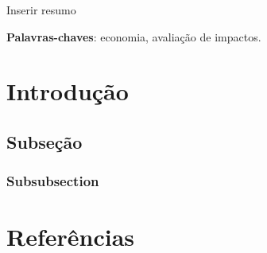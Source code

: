 \documentclass[12pt,english, french, spanish, german, brazil,a4paper,twoside, openright]{abntex2}	%
\begin{document}
	
	
	\frenchspacing 
	
	
\imprimircapa	%
\imprimirfolhaderosto	%

\begin{resumoumacoluna}
Inserir resumo	%

\vspace{\onelineskip}

\noindent
\textbf{Palavras-chaves}: economia, avaliação de impactos.	%
\end{resumoumacoluna}

\textual	%
\hypertarget{introduuxe7uxe3o}{%
\section{Introdução}\label{introduuxe7uxe3o}}

\hypertarget{subseuxe7uxe3o}{%
\subsection{Subseção}\label{subseuxe7uxe3o}}

\hypertarget{subsubsection}{%
\subsubsection{Subsubsection}\label{subsubsection}}

\postextual

\hypertarget{referuxeancias}{%
\section{Referências}\label{referuxeancias}}	%
\end{document}
